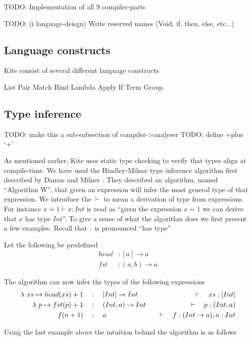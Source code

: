 
TODO: Implementation of all 9 compiler-parts

TODO: (i language-deisgn) Write reserved names (Void, if, then, else, etc...)

\subsection{Language constructs}

Kite consist of several different language constructs

List
Pair
Match
Bind
Lambda
Apply
If
Term
Group

\subsection{Type inference}
TODO: make this a sub-subsection of compiler->analyser
TODO: define +plus `+'

As mentioned earlier, Kite uses static type checking to verify that types align at compile-time. We have used the Hindley-Milner type inference algorithm first described by Damas and Milner \cite{milner82}. They described an algorithm, named ``Algorithm W'', that given an expression will infer the most general type of that expression. We introduce the $\vdash$ to mean a derivation of type from expressions. For instance $x = 1 \vdash x : Int$ is read as ``given the expression $x = 1$ we can derive that $x$ has type $Int$''. To give a sense of what the algorithm does we first present a few examples. Recall that $:$ is pronounced ``has type''

Let the following be predefined
\begin{align*}
  head   & : [a] \to a   \\
  fst    & : (a, b) \to a
\end{align*}

The algorithm can now infer the types of the following expressions
\begin{align*}
  \lambda{} \ xs \mapsto{} head(xs) + 1 & \quad:\quad [Int] \to Int    & \quad\vdash\quad xs : [Int]             \\
  \lambda{} \ p \mapsto{} fst(p) + 1    & \quad:\quad (Int, a) \to Int & \quad\vdash\quad p : (Int, a)           \\
  f(n + 1)              & \quad:\quad a                & \quad\vdash\quad f: (Int \to a), n: Int \\
\end{align*}

Using the last example above the intuition behind the algorithm is as follows

